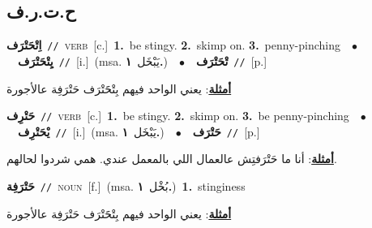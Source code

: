 \documentclass[10pt,a4paper,twoside]{article} %
\begin{document}
\begin{multicols}{2}
{{{{{{{{\vspace{-3mm}
\subsection*{\color{blue}\foreignlanguage{arabic}{ح.ت.ر.ف}\color{blue}{}} 

{\setlength\topsep{0pt}\textbf{\foreignlanguage{arabic}{اِتْحَتْرَف}}\ {\color{gray}\texttt{//}\color{black}}\ \textsc{verb}\ [c.]\ \textbf{1.}~be stingy.  \textbf{2.}~skimp on.  \textbf{3.}~penny-pinching\ \ $\bullet$\ \ \setlength\topsep{0pt}\textbf{\foreignlanguage{arabic}{يِتْحَتْرَف}}\ {\color{gray}\texttt{//}\color{black}}\ [i.]\ \color{gray}(msa. \foreignlanguage{arabic}{يَبْخَل}~\foreignlanguage{arabic}{\textbf{١.}})\color{black}\ \ $\bullet$\ \ \setlength\topsep{0pt}\textbf{\foreignlanguage{arabic}{تْحَتْرَف}}\ {\color{gray}\texttt{//}\color{black}}\ [p.]\  \begin{flushright}\color{gray}\foreignlanguage{arabic}{\textbf{\underline{\foreignlanguage{arabic}{أمثلة}}}: يعني الواحد فيهم بِتْحََتْرَف حَتْرَفِة عالأجورة}\end{flushright}\color{black}} \vspace{2mm}

{\setlength\topsep{0pt}\textbf{\foreignlanguage{arabic}{حَتْرِف}}\ {\color{gray}\texttt{//}\color{black}}\ \textsc{verb}\ [c.]\ \textbf{1.}~be stingy.  \textbf{2.}~skimp on.  \textbf{3.}~be penny-pinching\ \ $\bullet$\ \ \setlength\topsep{0pt}\textbf{\foreignlanguage{arabic}{يْحَتْرِف}}\ {\color{gray}\texttt{//}\color{black}}\ [i.]\ \color{gray}(msa. \foreignlanguage{arabic}{يَبْخَل}~\foreignlanguage{arabic}{\textbf{١.}})\color{black}\ \ $\bullet$\ \ \setlength\topsep{0pt}\textbf{\foreignlanguage{arabic}{حَتْرَف}}\ {\color{gray}\texttt{//}\color{black}}\ [p.]\  \begin{flushright}\color{gray}\foreignlanguage{arabic}{\textbf{\underline{\foreignlanguage{arabic}{أمثلة}}}: أنا ما حَتْرَفتِش عالعمال اللي بالمعمل عندي. همي شردوا لحالهم.}\end{flushright}\color{black}} \vspace{2mm}

{\setlength\topsep{0pt}\textbf{\foreignlanguage{arabic}{حَتْرَفِة}}\ {\color{gray}\texttt{//}\color{black}}\ \textsc{noun}\ [f.]\ \color{gray}(msa. \foreignlanguage{arabic}{بُخْل}~\foreignlanguage{arabic}{\textbf{١.}})\color{black}\ \textbf{1.}~stinginess\  \begin{flushright}\color{gray}\foreignlanguage{arabic}{\textbf{\underline{\foreignlanguage{arabic}{أمثلة}}}: يعني الواحد فيهم بِتْحََتْرَف حَتْرَفِة عالأجورة}\end{flushright}\color{black}} \vspace{2mm}

}}}}}}}}
\end{multicols}
\end{document}
